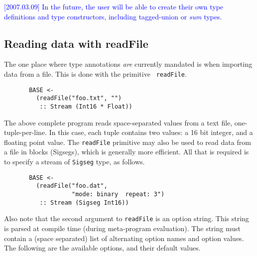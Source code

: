 \documentclass[twocolumn]{report}
\newcommand{\rednote}[1]{{\textcolor{blue}{#1}}}
\begin{document}
\rednote{[2007.03.09] In the future, the user will be able to create
  their own type definitions and type constructors, including
  tagged-union or {\em sum} types.}


\subsection{Reading data with readFile}

The one place where type annotations {\em are} currently mandated is
when importing data from a file.  This is done with the primitive {\tt
readFile}.
%
\begin{verbatim}
       BASE <- 
         (readFile("foo.txt", "") 
          :: Stream (Int16 * Float))
\end{verbatim}

The above complete program reads space-separated values from a text
file, one-tuple-per-line.  In this case, each tuple contains two
values: a 16 bit integer, and a floating point value.
The {\tt readFile} primitive may also be
used to read data from a file in blocks (Sigsegs), which is generally
more efficient.  All that is required is to specify a stream of
{\tt Sigseg} type, as follows.

\begin{verbatim}
       BASE <- 
         (readFile("foo.dat", 
                   "mode: binary  repeat: 3")
          :: Stream (Sigseg Int16))
\end{verbatim}

Also note that the second argument to {\tt readFile} is an option
string.  This string is parsed at compile time (during meta-program
evaluation).  The string must contain a (space separated) list of
alternating option names and option values.  The following are the
available options, and their default values.
\end{document}
